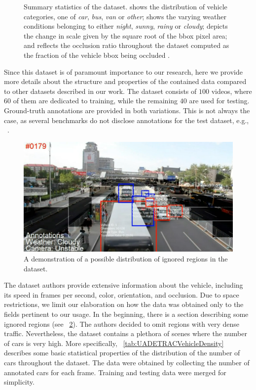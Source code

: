\begin{figure}[t]
\begin{subfigure}[b]{\uadetracfigsize\textwidth}
        \caption[]{}
    \end{subfigure}
    \caption[\uadetrac{} dataset overview]{Summary statistics of the \uadetrac{} dataset.  shows the distribution of vehicle categories, one of \emph{car}, \emph{bus}, \emph{van} or \emph{other};  shows the varying weather conditions belonging to either \emph{night}, \emph{sunny}, \emph{rainy} or \emph{cloudy};  depicts the change in scale given by the square root of the \gls{bbox} pixel area; and  reflects the occlusion ratio throughout the dataset computed as the fraction of the vehicle \gls{bbox} being occluded . }
    \label{fig:UADETRACStats}
\end{figure}

Since this dataset is of paramount importance to our research, here we provide more details about the structure and properties of the contained data compared to other datasets described in our work. The dataset consists of $100$ videos, where $60$ of them are dedicated to training, while the remaining $40$ are used for testing. Ground-truth annotations are provided in both variations. This is not always the case, as several benchmarks do not disclose annotations for the test dataset, e.g., ~\cite{geiger2012cvpr}.

\begin{figure}[t]
    \centerline{\includegraphics[width=0.8\linewidth]{figures/datasets/uadetrac_ignored_regions.png}}
    \caption[Ignored regions in \uadetrac{}]{A demonstration of a possible distribution of ignored regions in the \uadetrac{} dataset. }
    \label{fig:UADETRACIgnoredRegions}
\end{figure}

The dataset authors provide extensive information about the vehicle, including its speed in frames per second, color, orientation, and occlusion. Due to space restrictions, we limit our elaboration on how the data was obtained only to the fields pertinent to our usage. In the beginning, there is a section describing some ignored regions (see \figstr{}~\ref{fig:UADETRACIgnoredRegions}). The authors decided to omit regions with very dense traffic. Nevertheless, the dataset contains a plethora of scenes where the number of cars is very high. More specifically, \tablestr{}~\ref{tab:UADETRACVehicleDensity} describes some basic statistical properties of the distribution of the number of cars throughout the dataset. The data were obtained by collecting the number of annotated cars for each frame. Training and testing data were merged for simplicity.

